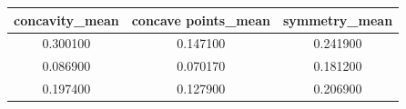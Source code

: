 \begin{tabular}{ccc}
\toprule
concavity\_mean & concave points\_mean & symmetry\_mean \\
\midrule
0.300100 & 0.147100 & 0.241900 \\
0.086900 & 0.070170 & 0.181200 \\
0.197400 & 0.127900 & 0.206900 \\
\bottomrule
\end{tabular} 